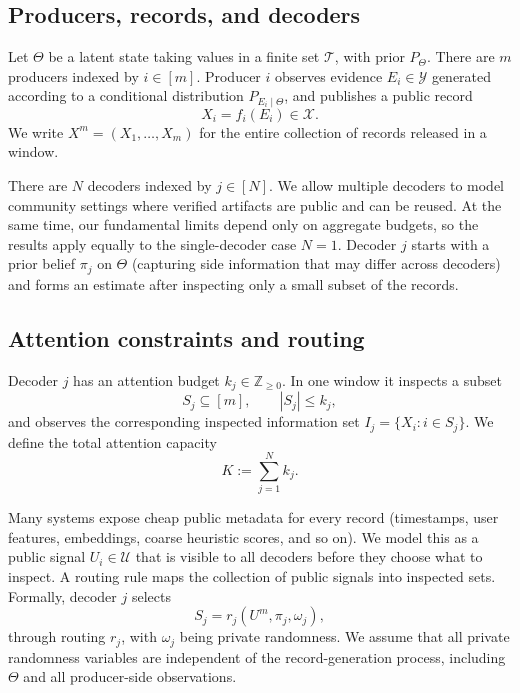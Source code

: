 \documentclass[twocolumn]{scholar7}
\newcommand{\cT}{\mathcal{T}}
\newcommand{\cU}{\mathcal{U}}
\newcommand{\cX}{\mathcal{X}}
\newcommand{\cY}{\mathcal{Y}}
\newcommand{\abs}[1]{\left|#1\right|}
\newcommand{\bracks}[1]{\left[#1\right]}
\newcommand{\idx}[1]{\bracks{#1}} %
\begin{document}
\subsection{Producers, records, and decoders}
Let $\Theta$ be a latent state taking values in a finite set $\cT$, with prior $P_\Theta$.
There are $m$ producers indexed by $i\in\idx{m}$.
Producer $i$ observes evidence $E_i\in\cY$ generated according to a conditional distribution $P_{E_i\mid\Theta}$, and publishes a public record
\[
  X_i=f_i(E_i)\in\cX.
\]
We write $X^m=(X_1,\dots,X_m)$ for the entire collection of records released in a window.

There are $N$ decoders indexed by $j\in\idx{N}$.
We allow multiple decoders to model community settings where verified artifacts are public and can be reused.
At the same time, our fundamental limits depend only on aggregate budgets, so the results apply equally to the single-decoder case $N=1$.
Decoder $j$ starts with a prior belief $\pi_j$ on $\Theta$ (capturing side information that may differ across decoders) and forms an estimate after inspecting only a small subset of the records.

\subsection{Attention constraints and routing}
Decoder $j$ has an attention budget $k_j\in\mathbb{Z}_{\ge 0}$.
In one window it inspects a subset
\[
  S_j\subseteq\idx{m},\qquad \abs{S_j}\le k_j,
\]
and observes the corresponding inspected information set $I_j=\{X_i:i\in S_j\}$.
We define the total attention capacity
\[
  K:=\sum_{j=1}^N k_j.
\]

Many systems expose cheap public metadata for every record (timestamps, user features, embeddings, coarse heuristic scores, and so on).
We model this as a public signal $U_i\in\cU$ that is visible to all decoders before they choose what to inspect.
A routing rule maps the collection of public signals into inspected sets.
Formally, decoder $j$ selects
\[
  S_j=r_j(U^m,\pi_j,\omega_j),
\]
through routing $r_j$, with $\omega_j$ being private randomness.
We assume that all private randomness variables are independent of the record-generation process, including $\Theta$ and all producer-side observations.
\end{document}
